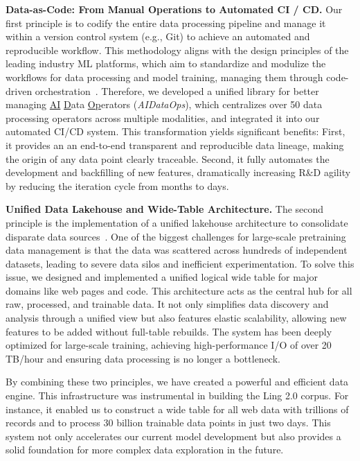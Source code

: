 \documentclass[table]{gtech}
\theoremstyle{definition}
\begin{document}
{\bfseries Data-as-Code: From Manual Operations to Automated CI / CD. }
Our first principle is to codify the entire data processing pipeline and manage it within a version control system (e.g., Git) to achieve an automated and reproducible workflow. This methodology aligns with the design principles of the leading industry ML platforms, which aim to standardize and modulize the workflows for data processing and model training, managing them through code-driven orchestration~\citep{datainfra1}. Therefore, we developed a unified library for better managing \underline{AI} \underline{D}ata \underline{Op}erators (\emph{AIDataOps}), which centralizes over 50 data processing operators across multiple modalities, and integrated it into our automated CI/CD system. This transformation yields significant benefits: First, it provides an an end-to-end transparent and reproducible data lineage, making the origin of any data point clearly traceable. Second, it fully automates the development and backfilling of new features, dramatically increasing R\&D agility by reducing the iteration cycle from months to days.

{\bfseries Unified Data Lakehouse and Wide-Table Architecture. }
The second principle is the implementation of a unified lakehouse architecture to consolidate disparate data sources~\citep{datainfra2}. One of the biggest challenges for large-scale pretraining data management is that the data was scattered across hundreds of independent datasets, leading to severe data silos and inefficient experimentation. To solve this issue, we designed and implemented a unified logical wide table for major domains like web pages and code. This architecture acts as the central hub for all raw, processed, and trainable data. It not only simplifies data discovery and analysis through a unified view but also features elastic scalability, allowing new features to be added without full-table rebuilds. The system has been deeply optimized for large-scale training, achieving high-performance I/O of over 20 TB/hour and ensuring data processing is no longer a bottleneck.

By combining these two principles, we have created a powerful and efficient data engine. This infrastructure was instrumental in building the Ling 2.0 corpus. For instance, it enabled us to construct a wide table for all web data with trillions of records and to process 30 billion trainable data points in just two days. This system not only accelerates our current model development but also provides a solid foundation for more complex data exploration in the future.
\end{document}
